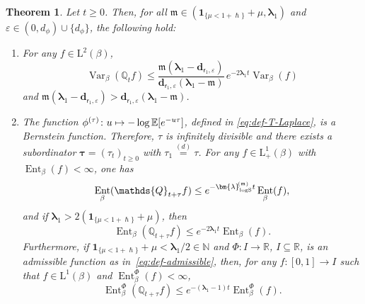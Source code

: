\documentclass[10pt]{amsart}
\let\epsilon\varepsilon
\newcommand\mto{\mathchoice{\longmapsto}{\mapsto}{\mapsto}{\mapsto}}
\theoremstyle{plain}
\newtheorem{theorem}{Theorem}[section]
\theoremstyle{definition}
\DeclareMathOperator{\Var}{Var}
\DeclareMathOperator{\Ent}{Ent}
\newcommand{\E}{\mathbb{E}}
\newcommand{\N}{\mathbb{N}}
\newcommand{\R}{\mathbb{R}}
\newcommand{\J}{\mathds{Q}}
\newcommand{\Leb}{\mathrm{L}}
\newcommand{\m}{\mathfrak{m}}
\newcommand{\dpt}{\bm{d}_{\vat,\epsilon}}
\newcommand{\lam}{{\bm{\lambda}_1}}
\newcommand{\vat}{{\mathsf{r}_1}}
\newcommand{\logSob}[1][\mo]{\bm{\lambda}_{\mathrm{logS}}^{\hspace{-0.06cm}(#1)}}
\let\h\hslash
\let\mo\mu
\let\bpsi\beta
\begin{document}
\begin{theorem}
\label{thm:convergence-equilibrium} Let $t \geq 0$. Then, for all $\m \in (\bm{1}_{\{\mo < 1+\h\}} + \mo ,\lam)$
and $\epsilon \in (0,d_\phi) \cup \{d_\phi\}$, the following hold:
\begin{enumerate}
\item \label{item-1:thm:convergence-equilibrium} For any $f \in \Leb^2(\bpsi)$,
\begin{equation*}
\Var_\bpsi(\J_t f) \leq \frac{\m(\lam-\dpt)}{\dpt(\lam-\m)}\, e^{-2\lam t} \Var_\bpsi(f)
\end{equation*}
and $\m(\lam-\dpt) > \dpt(\lam-\m)$.
\item \label{item-2:thm:convergence-equilibrium}
The function $\phi^{(\tau)} \colon u \mto - \log \E[e^{-u \tau}]$, defined in \eqref{eq:def-T-Laplace}, is a Bernstein function. Therefore,
$\tau$ is infinitely divisible and there exists a subordinator $\bm{\tau} = (\tau_t)_{t \geq 0}$ with $\tau_1 \stackrel{(d)}{=} \tau$. For any $f \in \Leb^1_+(\bpsi)$ with $\Ent_\bpsi(f) < \infty$, one has
\begin{equation*}
\Ent_\bpsi(\J_{t+\tau} f) \leq e^{- \logSob[\m] t} \Ent_\bpsi(f),
\end{equation*}
and if $\lam > 2(\bm{1}_{\{\mo < 1+\h \}} + \mo)$, then
\begin{equation*}
\Ent_\bpsi(\J_{t+\tau} f) \leq e^{- 2 \lam t} \Ent_\bpsi(f).
\end{equation*}
Furthermore, if $\bm{1}_{\{\mo < 1+\h \}} + \mo < \lam/2 \in \N$ and $\Phi \colon I \to \R$, $I \subseteq \R$, is an admissible function as in~\eqref{eq:def-admissible}, then, for any $f \colon [0,1]\!\to\! I$ such that $f \!\in\!\Leb^1(\bpsi)$ and \hbox{$\Ent_\bpsi^\Phi(f)\!<\!\infty$},
\begin{equation*}
\Ent_\bpsi^\Phi(\J_{t+\tau} f) \leq e^{-(\lam-1)t} \Ent_\bpsi^\Phi(f).
\end{equation*}
\end{enumerate}
\end{theorem}
\end{document}
